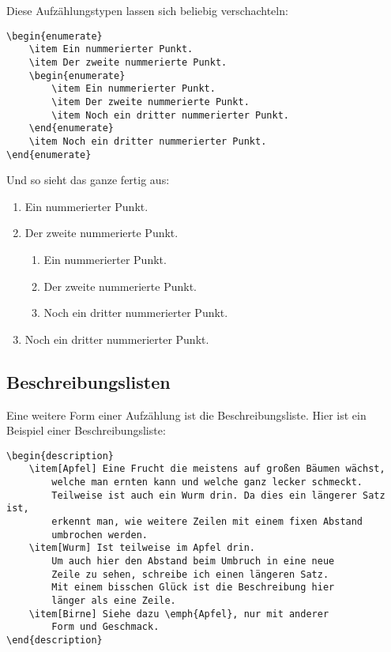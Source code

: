 Diese Aufzählungstypen lassen sich beliebig verschachteln:
\begin{lstlisting}
\begin{enumerate}
	\item Ein nummerierter Punkt.
	\item Der zweite nummerierte Punkt.
	\begin{enumerate}
		\item Ein nummerierter Punkt.
		\item Der zweite nummerierte Punkt.
		\item Noch ein dritter nummerierter Punkt.
	\end{enumerate}
	\item Noch ein dritter nummerierter Punkt.
\end{enumerate}
\end{lstlisting}

Und so sieht das ganze fertig aus:

\begin{enumerate}
	\item Ein nummerierter Punkt.
	\item Der zweite nummerierte Punkt.
	\begin{enumerate}
		\item Ein nummerierter Punkt.
		\item Der zweite nummerierte Punkt.
		\item Noch ein dritter nummerierter Punkt.
	\end{enumerate}
	\item Noch ein dritter nummerierter Punkt.
\end{enumerate}


\subsection{Beschreibungslisten}

Eine weitere Form einer Aufzählung ist die Beschreibungsliste. Hier ist ein Beispiel einer Beschreibungsliste:
\begin{lstlisting}
\begin{description}
	\item[Apfel] Eine Frucht die meistens auf großen Bäumen wächst,
		welche man ernten kann und welche ganz lecker schmeckt.
		Teilweise ist auch ein Wurm drin. Da dies ein längerer Satz ist,
		erkennt man, wie weitere Zeilen mit einem fixen Abstand 
		umbrochen werden.
	\item[Wurm] Ist teilweise im Apfel drin.
		Um auch hier den Abstand beim Umbruch in eine neue 
		Zeile zu sehen, schreibe ich einen längeren Satz.
		Mit einem bisschen Glück ist die Beschreibung hier
		länger als eine Zeile.
	\item[Birne] Siehe dazu \emph{Apfel}, nur mit anderer
		Form und Geschmack.
\end{description}
\end{lstlisting}

